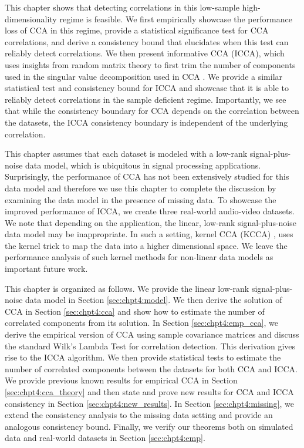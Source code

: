 This chapter shows that detecting correlations in this low-sample high-dimensionality
regime is feasible. We first empirically showcase the performance loss of CCA in this
regime, provide a statistical significance test for CCA correlations, and derive a
consistency bound that elucidates when this test can reliably detect correlations. We then
present informative CCA (ICCA), which uses insights from random matrix theory to first
trim the number of components used in the singular value decomposition used in CCA
\cite{nadakuditi2011fundamental}. We provide a similar statistical test and consistency
bound for ICCA and showcase that it is able to reliably detect correlations in the sample
deficient regime. Importantly, we see that while the consistency boundary for CCA depends
on the correlation between the datasets, the ICCA consistency boundary is independent of
the underlying correlation.

This chapter assumes that each dataset is modeled with a low-rank signal-plus-noise data
model, which is ubiquitous in signal processing applications. Surprisingly, the
performance of CCA has not been extensively studied for this data model and therefore we
use this chapter to complete the discussion by examining the data model in the presence of
missing data. To showcase the improved performance of ICCA, we create three real-world
audio-video datasets. We note that depending on the application, the linear, low-rank
signal-plus-noise data model may be inappropriate. In such a setting, kernel CCA (KCCA)
\cite{welling2005kcca,yu2007learning}, uses the kernel trick to map the data into a higher
dimensional space. We leave the performance analysis of such kernel methods for non-linear
data models as important future work.

This chapter is organized as follows. We provide the linear low-rank signal-plus-noise
data model in Section \ref{sec:chpt4:model}. We then derive the solution of CCA in Section
\ref{sec:chpt4:cca} and show how to estimate the number of correlated components from its
solution. In Section \ref{sec:chpt4:emp_cca}, we derive the empirical version of CCA using
sample covariance matrices and discuss the standard Wilk's Lambda Test for correlation
detection. This derivation gives rise to the ICCA algorithm. We then provide statistical
tests to estimate the number of correlated components between the datasets for both CCA
and ICCA. We provide previous known results for empirical CCA in Section
\ref{sec:chpt4:cca_theory} and then state and prove new results for CCA and ICCA
consistency in Section \ref{sec:chpt4:new_results}. In Section \ref{sec:chpt4:missing}, we
extend the consistency analysis to the missing data setting and provide an analogous
consistency bound. Finally, we verify our theorems both on simulated data and real-world
datasets in Section \ref{sec:chpt4:emp}.


